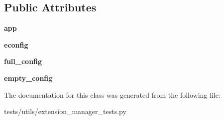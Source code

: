 \subsection*{Public Attributes}
\begin{DoxyCompactItemize}
\item 
\hypertarget{classtests_1_1utils_1_1extension__manager__tests_1_1ConfigManagerTests_af67e4d12f4575bda0b3d25dda63e2ea5}{{\bfseries app}}\label{classtests_1_1utils_1_1extension__manager__tests_1_1ConfigManagerTests_af67e4d12f4575bda0b3d25dda63e2ea5}

\item 
\hypertarget{classtests_1_1utils_1_1extension__manager__tests_1_1ConfigManagerTests_aae5dc5cd86e14b07f1d8b3713d5fa8f4}{{\bfseries econfig}}\label{classtests_1_1utils_1_1extension__manager__tests_1_1ConfigManagerTests_aae5dc5cd86e14b07f1d8b3713d5fa8f4}

\item 
\hypertarget{classtests_1_1utils_1_1extension__manager__tests_1_1ConfigManagerTests_ab5f46c854c44437f5150817e006559d7}{{\bfseries full\+\_\+config}}\label{classtests_1_1utils_1_1extension__manager__tests_1_1ConfigManagerTests_ab5f46c854c44437f5150817e006559d7}

\item 
\hypertarget{classtests_1_1utils_1_1extension__manager__tests_1_1ConfigManagerTests_a0f46e46f16faf60274370dde12326477}{{\bfseries empty\+\_\+config}}\label{classtests_1_1utils_1_1extension__manager__tests_1_1ConfigManagerTests_a0f46e46f16faf60274370dde12326477}

\end{DoxyCompactItemize}


The documentation for this class was generated from the following file\+:\begin{DoxyCompactItemize}
\item 
tests/utils/extension\+\_\+manager\+\_\+tests.\+py\end{DoxyCompactItemize}

